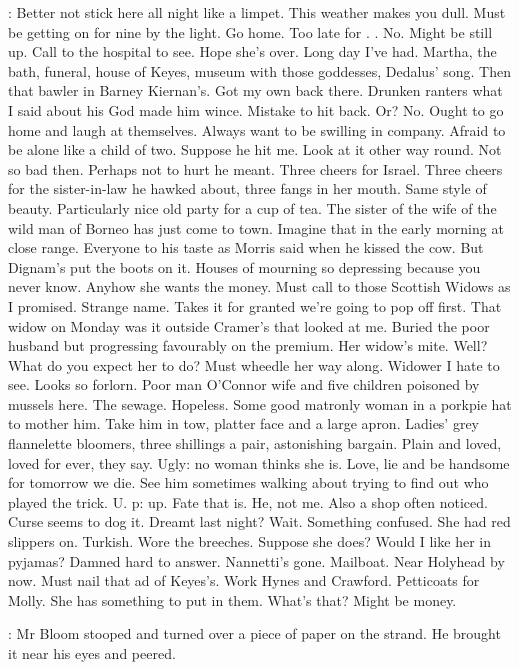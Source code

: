 \Bloom:
Better not stick here all night like a limpet.
This weather makes you
dull.
Must be getting on for nine by the light.
Go home.
Too late for .
.
No.
Might be still up.
Call to the hospital to see.
Hope she's over.
Long day I've had.
Martha,
the bath,
funeral,
house of
Keyes,
museum with those goddesses,
Dedalus' song.
Then that bawler in
Barney Kiernan's.
Got my own back there.
Drunken ranters what I said about
his God made him wince.
Mistake to hit back.
Or?
No.
Ought to go home and
laugh at themselves.
Always want to be swilling in company.
Afraid to be
alone like a child of two.
Suppose he hit me.
Look at it other way round.
Not so bad then.
Perhaps not to hurt he meant.
Three cheers for Israel.
Three cheers for the sister-in-law he hawked about,
three fangs in her
mouth.
Same style of beauty.
Particularly nice old party for a cup of tea.
The sister of the wife of the wild man of Borneo has just come to town.
Imagine that in the early morning at close range.
Everyone to his taste as
Morris said when he kissed the cow.
But Dignam's put the boots on it.
Houses of mourning so depressing because you never know.
Anyhow she
wants the money.
Must call to those Scottish Widows as I promised.
Strange
name.
Takes it for granted we're going to pop off first.
That widow
on Monday was it outside Cramer's that looked at me.
Buried the poor
husband but progressing favourably on the premium.
Her widow's mite.
Well?
What do you expect her to do?
Must wheedle her way along.
Widower I hate to see.
Looks so forlorn.
Poor man O'Connor wife and five
children poisoned by mussels here.
The sewage.
Hopeless.
Some good
matronly woman in a porkpie hat to mother him.
Take him in tow,
platter
face and a large apron.
Ladies' grey flannelette bloomers,
three shillings
a pair,
astonishing bargain.
Plain and loved,
loved for ever,
they say.
Ugly:
no woman thinks she is.
Love,
lie and be handsome for tomorrow we
die.
See him sometimes walking about trying to find out who played the
trick.
U.
p:
up.
Fate that is.
He,
not me.
Also a shop often noticed.
Curse seems to dog it.
Dreamt last night?
Wait.
Something confused.
She
had red slippers on.
Turkish.
Wore the breeches.
Suppose she does?
Would
I like her in pyjamas?
Damned hard to answer.
Nannetti's gone.
Mailboat.
Near Holyhead by now.
Must nail that ad of Keyes's.
Work Hynes and
Crawford.
Petticoats for Molly.
She has something to put in them.
What's
that?
Might be money.

:
Mr Bloom stooped and turned over a piece of paper on the strand.
He
brought it near his eyes and peered.

